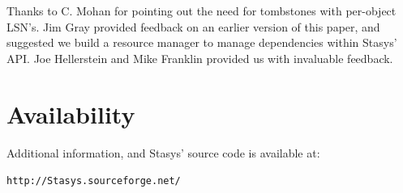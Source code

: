 \documentclass[letterpaper,twocolumn,10pt]{article}
\newcommand{\yad}{Stasys\xspace}
\newcommand{\yads}{Stasys'\xspace}
\begin{document}
Thanks to C. Mohan for pointing out the need for tombstones with
per-object LSN's.  Jim Gray provided feedback on an earlier version of
this paper, and suggested we build a resource manager to manage
dependencies within \yads API.  Joe Hellerstein and Mike Franklin
provided us with invaluable feedback.

\section{Availability}

Additional information, and \yads source code is available at:

\begin{center}
{\tt http://\yad.sourceforge.net/}
\end{center}

{\footnotesize 
\nocite{*}
}

\theendnotes
\end{document}
